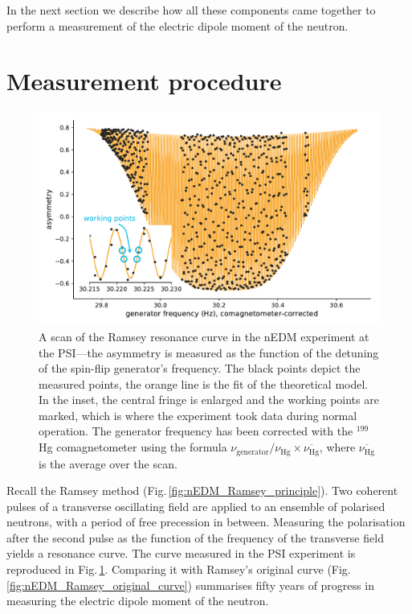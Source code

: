 In the next section we describe how all these components came together to perform a measurement of the electric dipole moment of the neutron.



\section{Measurement procedure}
\begin{figure}
  \centering
  \includegraphics[width=0.8\linewidth]{gfx/nEDMatPSI/ramsey_scan.pdf}
  \caption{A scan of the Ramsey resonance curve in the nEDM experiment at the PSI---the asymmetry is measured as the function of the detuning of the spin-flip generator's frequency. The black points depict the measured points, the orange line is the fit of the theoretical model. In the inset, the central fringe is enlarged and the working points are marked, which is where the experiment took data during normal operation. The generator frequency has been corrected with the $^{199}$Hg comagnetometer using the formula $\nu_\text{generator} / \nu_\text{Hg} \times \overline{\nu_\text{Hg}}$, where $\overline{\nu_\text{Hg}}$ is the average over the scan.}
  \label{fig:ramsey_scan}
\end{figure}

Recall the Ramsey method (Fig.\,\ref{fig:nEDM_Ramsey_principle}). Two coherent pulses of a transverse oscillating field are applied to an ensemble of polarised neutrons, with a period of free precession in between. Measuring the polarisation after the second pulse as the function of the frequency of the transverse field yields a resonance curve. The curve measured in the PSI experiment is reproduced in Fig.\,\ref{fig:ramsey_scan}. Comparing it with Ramsey's original curve (Fig.\,\ref{fig:nEDM_Ramsey_original_curve}) summarises fifty years of progress in measuring the electric dipole moment of the neutron.

